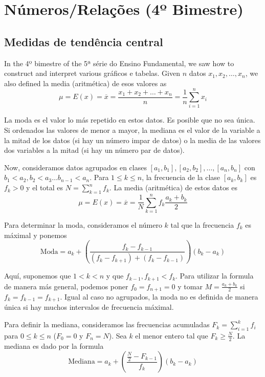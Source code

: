 \chapter{Números/Relações (4º Bimestre)}

\section{Medidas de tendência central}

In the 4º bimestre of the 5ª série do Ensino Fundamental, we saw how to
construct and interpret various gráficos e tabelas. Given $n$ datos
$x_1, x_2, \ldots, x_n$, we also defined la media (aritmética) de esos
valores as
$$\mu = E(x) =
\overline{x} = \frac{x_1 + x_2 + \ldots + x_n}{n} = \frac{1}{n}\sum_{i=1}^n x_i$$

La moda es el valor lo más repetido en estos datos. Es posible que no sea
única. Si ordenados las valores de menor a mayor, la mediana es el valor de la
variable a la mitad de los datos (si hay un número impar de datos)
o la media de las valores dos variables a la mitad (si hay un número par de
datos).

Now, consideramos datos agrupados en clases
${[a_1, b_1]}, {[a_2, b_2]}, \ldots, {[a_n, b_n]}$ con
$b_1 < a_2, b_2 < a_3 \ldots b_{n-1} < a_n$. Para $1 \leq k \leq n$, la
frecuencia de la clase $[a_k, b_k]$ es $f_k > 0$ y el total es
$N = \sum_{k=1}^n f_k$. La media (aritmética) de estos datos es
$$
\mu = E(x) =
\overline{x} = \frac{1}{N} \sum_{k=1}^n f_k \frac{a_k + b_k}{2}
$$

Para determinar la moda, consideramos el número $k$ tal que la frecuencia $f_k$
es máximal y ponemos
$$
\text{Moda}
= a_k + \left( \frac{f_{k} - f_{k-1}}{{(f_k - f_{k+1})} + {(f_{k} - f_{k-1})}}
\right) \left(b_k - a_k \right)
$$

Aquí, suponemos que $1 < k < n$ y que $f_{k-1}, f_{k+1} < f_k$. Para utilizar
la formula de manera más general, podemos poner $f_0 = f_{n+1} = 0$ y
tomar $M = \frac{a_k+b_k}{2}$ si $f_k = f_{k-1} = f_{k+1}$. Igual al caso
no agrupados, la moda no es definida de manera única si hay muchos
intervalos de frecuencia máximal.

Para definir la mediana, consideramos las frecuencias acumuladas
$F_k = \sum_{i=1}^k f_i$ para $0 \leq k \leq n$ ($F_0 = 0$ y
$F_n = N$). Sea $k$ el menor
entero tal que $F_k \geq \frac{N}{2}$. La mediana es dado por la formula
$$
\text{Mediana} =
a_k + \left( \frac{\frac{N}{2} - F_{k-1}}{f_k}
\right) \left(b_k - a_k \right)
$$


